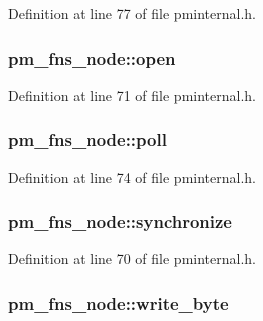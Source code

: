 Definition at line 77 of file pminternal.\+h.

\subsubsection[{\texorpdfstring{open}{open}}]{ pm\+\_\+fns\+\_\+node\+::open}\hypertarget{structpm__fns__node_a05cf57c08b47348d05637bfe1da193d2}{}\label{structpm__fns__node_a05cf57c08b47348d05637bfe1da193d2}


Definition at line 71 of file pminternal.\+h.

\subsubsection[{\texorpdfstring{poll}{poll}}]{ pm\+\_\+fns\+\_\+node\+::poll}\hypertarget{structpm__fns__node_a182a3f95a854ae3e4f89864a0476f90b}{}\label{structpm__fns__node_a182a3f95a854ae3e4f89864a0476f90b}


Definition at line 74 of file pminternal.\+h.

\subsubsection[{\texorpdfstring{synchronize}{synchronize}}]{ pm\+\_\+fns\+\_\+node\+::synchronize}\hypertarget{structpm__fns__node_add292a3d1444e53bd42a71e9f9fad60c}{}\label{structpm__fns__node_add292a3d1444e53bd42a71e9f9fad60c}


Definition at line 70 of file pminternal.\+h.

\subsubsection[{\texorpdfstring{write\+\_\+byte}{write_byte}}]{ pm\+\_\+fns\+\_\+node\+::write\+\_\+byte}\hypertarget{structpm__fns__node_af5b068dc9632efbb967b37f2fbb65d75}{}\label{structpm__fns__node_af5b068dc9632efbb967b37f2fbb65d75}


